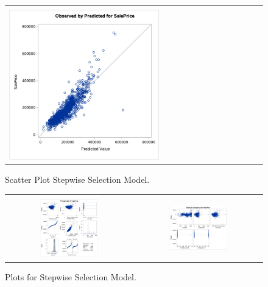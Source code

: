 \documentclass[11pt]{scrartcl} %
\begin{document}
\begin{figure}[H] %
	\centering
	\begin{tabular}{| p{}|}
	\hline
	\\
	\includegraphics[width=0.60\textwidth]{../graphics/A2SWscatt}\\
	\hline
	\end{tabular}	
	\caption{Scatter Plot Stepwise Selection Model.}
	\label{fig:A2SWscatt}
\end{figure}
\begin{figure}[H] %
	\centering
	\begin{tabular}{p{} p{}}
	\hline
	\multicolumn{1}{|c}{} &  \multicolumn{1}{c|}{} \\
		\multicolumn{1}{|c}{\includegraphics[width=0.48\textwidth]{../graphics/A2SWAss1}} &
		\multicolumn{1}{c|}{\includegraphics[width=0.48\textwidth]{../graphics/A2SWAss2}}\\
		\hline
	\end{tabular}		
	\caption{Plots for Stepwise Selection Model.}
	\label{fig:A2SWAss}
\end{figure}
\end{document}
